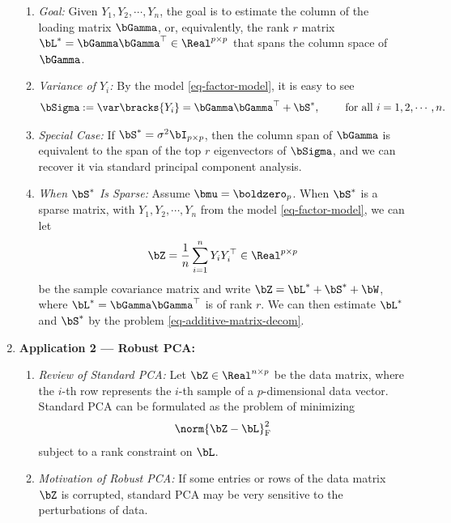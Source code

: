 \documentclass[12pt]{article}
\begin{document}
\begin{enumerate}[label=\textbf{\arabic*.}]
\begin{enumerate}
		\item \textit{Goal:} Given $Y_1, Y_2, \cdots, Y_n$, the goal is to estimate the column of the loading matrix $\bGamma$, or, equivalently, the rank $r$ matrix $\bL^* = \bGamma \bGamma^\top \in \Real^{p \times p}$ that spans the column space of $\bGamma$. 
		
		\item \textit{Variance of $Y_i$:} By the model \eqref{eq-factor-model}, it is easy to see 
		\begin{align*}
			\bSigma := \var \bracks{Y_i} = \bGamma \bGamma^\top + \bS^*, \qquad \text{ for all } i = 1, 2, \cdots, n. 
		\end{align*}
		
		\item \textit{Special Case:} If $\bS^* = \sigma^2 \bI_{p \times p}$, then the column span of $\bGamma$ is equivalent to the span of the top $r$ eigenvectors of $\bSigma$, and we can recover it via standard principal component analysis. 
		
		\item \textit{When $\bS^*$ Is Sparse:} Assume $\bmu = \boldzero_p$. When $\bS^*$ is a sparse matrix, with $Y_1, Y_2, \cdots, Y_n$ from the model \eqref{eq-factor-model}, we can let 
		\begin{align*}
			\bZ = \frac{1}{n} \sum_{i=1}^n Y_i Y_i^\top \in \Real^{p \times p}
		\end{align*}
		be the sample covariance matrix and write $\bZ = \bL^* + \bS^* + \bW$, where $\bL^* = \bGamma \bGamma^\top$ is of rank $r$. We can then estimate $\bL^*$ and $\bS^*$ by the problem \eqref{eq-additive-matrix-decom}. 
	
	\end{enumerate}
	
	\item \textbf{Application 2 --- Robust PCA:}
	\begin{enumerate}
		\item \textit{Review of Standard PCA:} Let $\bZ \in \Real^{n \times p}$ be the data matrix, where the $i$-th row represents the $i$-th sample of a $p$-dimensional data vector. Standard PCA can be formulated as the problem of minimizing 
		\begin{align*}
			\norm{\bZ - \bL}_{\mathrm{F}}^2 
		\end{align*}
		subject to a rank constraint on $\bL$. 
		
		\item \textit{Motivation of Robust PCA:} If some entries or rows of the data matrix $\bZ$ is corrupted, standard PCA may be very sensitive to the perturbations of data. 
		

\end{enumerate}
\end{enumerate}
\end{document}
